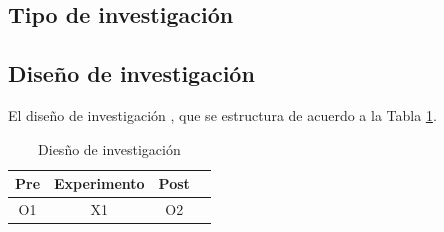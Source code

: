 \documentclass[12pt,a4paper]{article}
\begin{document}
\subsection{Tipo de investigación}
%

%


\subsection{Diseño de investigación}
El diseño de investigación \MakeTextLowercase{\diseno}, que se estructura de acuerdo a la Tabla \ref{figg}.


\begin{table}[ht!]
	\caption{Diesño de investigación}
	\label{figg}
	\centering
	\begin{tabular}{cccc}
		\toprule
		Pre & Experimento & Post \\
		\midrule
		O1  & X1          & O2   \\
		\bottomrule
	\end{tabular}
\end{table}
\end{document}
